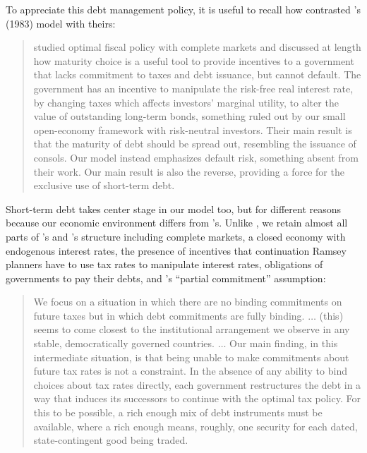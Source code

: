\documentclass[12pt]{article}
\begin{document}
	To appreciate  this  debt management policy, it is useful to recall how
	\citet*{aguiar2019take}   contrasted  \citeauthor{LucasStokey1983}'s (1983) model with theirs: 
	{\it 
\begin{quotation}
	\citet{LucasStokey1983} studied optimal fiscal policy with complete markets and discussed
	at length how maturity choice is a useful tool to provide incentives to a government 
	that lacks commitment to taxes and debt issuance, but cannot default. The government
	has an incentive to manipulate the risk-free real interest rate, by changing taxes which affects
	investors' marginal utility, to alter the value of outstanding long-term bonds, something
	ruled out by our small open-economy framework with risk-neutral investors. Their
	main result is that the maturity of debt should be spread out, resembling the issuance of
	consols. Our model instead emphasizes default risk, something absent from their work.
	Our main result is also the reverse, providing a force for the exclusive use of short-term
	debt.
\end{quotation}
}


Short-term debt takes center stage  in our model too, but   for different reasons  because our economic environment differs from \citeauthor{aguiar2019take}'s. 
 Unlike \citet{aguiar2019take},
we retain almost all parts  of   \citeauthor{LucasStokey1983}'s and \citeauthor{debortoli2021optimal}'s structure including complete markets,
a closed economy with endogenous interest rates, the presence of 
incentives that  continuation Ramsey planners  have  to use  tax rates to manipulate interest rates, 
 obligations of  governments to pay their debts, and \citeauthor{LucasStokey1983}'s  ``partial commitment'' assumption:

{\it
\begin{quotation}
  We focus on a situation in which there are no binding commitments
on future taxes but in which debt commitments are fully binding.
 $\ldots$ (this) seems to come closest to the institutional arrangement we
observe in any stable, democratically governed countries. $\ldots$
 Our main finding, in this intermediate situation, is that being unable
to make commitments about future tax rates is not a constraint. In
the absence of any ability to bind choices about tax rates directly,
each government restructures the debt in a way that  induces its
successors to continue with the optimal tax policy.
  For this to be possible, a rich enough mix of debt instruments must
be available, where a rich enough means, roughly, one security for
each dated, state-contingent good being traded.

\quad \quad \citet[p.~69]{LucasStokey1983}

\end{quotation}
}
\end{document}
